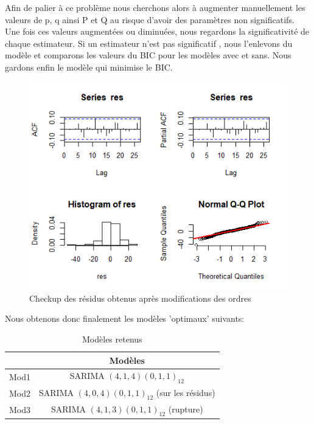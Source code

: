 \documentclass[12pt,a4paper]{book}
\newcommand{\1}{\mathds{1}}
\begin{document}
Afin de palier à ce problème nous cherchons alors à augmenter manuellement les valeurs de p, q ainsi P et Q au risque d'avoir des paramètres non significatifs. Une fois ces valeurs augmentées ou diminuées, nous regardons la significativité de chaque estimateur. Si un estimateur n'est pas significatif , nous l'enlevons du modèle et comparons les valeurs du BIC pour les modèles avec et sans. Nous gardons enfin le modèle qui minimise le BIC.

\begin{figure}[h]
\centering
    \includegraphics[width=\textwidth]{beaux_residus}  
\caption{Checkup des résidus obtenus après modifications des ordres}
\end{figure}

\noindent
Nous obtenons donc finalement les modèles 'optimaux' suivants:

\begin{table}[h]
  \begin{center}
    \caption{Modèles retenus}
    \label{tab:table1}
    \begin{tabular}{l|c}
      \ & \textbf{Modèles}\\
      \hline
      Mod1 & SARIMA $(4,1,4)(0,1,1)_{12}$\\
      Mod2 & SARIMA $(4,0,4)(0,1,1)_{12}$ (sur les résidus)\\
      Mod3 & SARIMA  $(4,1,3)(0,1,1)_{12}$ (rupture)\\
    \end{tabular}
  \end{center}
\end{table}
\end{document}
